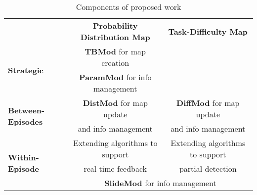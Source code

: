 \begin{table}
\centering
		\begin{tabular}{|l|c|c|}
			\hline
				& \multirow{2}{*}{\textbf{Probability Distribution Map}} & \multirow{2}{*}{\textbf{Task-Difficulty Map}}  \\
				& & \\
			\hline
				\multirow{2}{*}{\textbf{Strategic}} & \textbf{TBMod} for map creation &  \\
				& \textbf{ParamMod} for info management & \\
			\hline
				\multirow{2}{*}{\textbf{Between-Episodes}} & \textbf{DistMod} for map update &  \textbf{DiffMod} for map update \\
				& and info management & and info management \\
			\hline
				\multirow{3}{*}{\textbf{Within-Episode}} & Extending algorithms to support & Extending algorithms to support\\
				& real-time feedback &  partial detection \\ \cline{2-3}
				& \multicolumn{2}{|c|}{\textbf{SlideMod} for info management} \\
			\hline
		\end{tabular}
	\caption{Components of proposed work}	
	\label{components}
\end{table}


